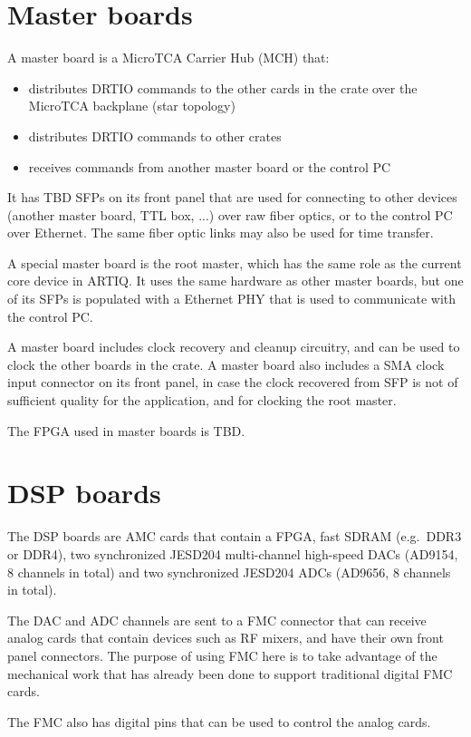 \documentclass[11pt]{paper}
\begin{document}
\section{Master boards}
A master board is a MicroTCA Carrier Hub (MCH) that:
\begin{itemize}
\item distributes DRTIO commands to the other cards in the crate over the MicroTCA backplane (star topology)
\item distributes DRTIO commands to other crates
\item receives commands from another master board or the control PC
\end{itemize}

It has TBD SFPs on its front panel that are used for connecting to other devices (another master board, TTL box, ...) over raw fiber optics, or to the control PC over Ethernet. The same fiber optic links may also be used for time transfer.

A special master board is the root master, which has the same role as the current core device in ARTIQ. It uses the same hardware as other master boards, but one of its SFPs is populated with a Ethernet PHY that is used to communicate with the control PC.

A master board includes clock recovery and cleanup circuitry, and can be used to clock the other boards in the crate. A master board also includes a SMA clock input connector on its front panel, in case the clock recovered from SFP is not of sufficient quality for the application, and for clocking the root master.

The FPGA used in master boards is TBD.

\section{DSP boards}
The DSP boards are AMC cards that contain a FPGA, fast SDRAM (e.g.\ DDR3 or DDR4), two synchronized JESD204 multi-channel high-speed DACs (AD9154, 8 channels in total) and two synchronized JESD204 ADCs (AD9656, 8 channels in total).

The DAC and ADC channels are sent to a FMC connector that can receive analog cards that contain devices such as RF mixers, and have their own front panel connectors. The purpose of using FMC here is to take advantage of the mechanical work that has already been done to support traditional digital FMC cards.

The FMC also has digital pins that can be used to control the analog cards.
\end{document}
